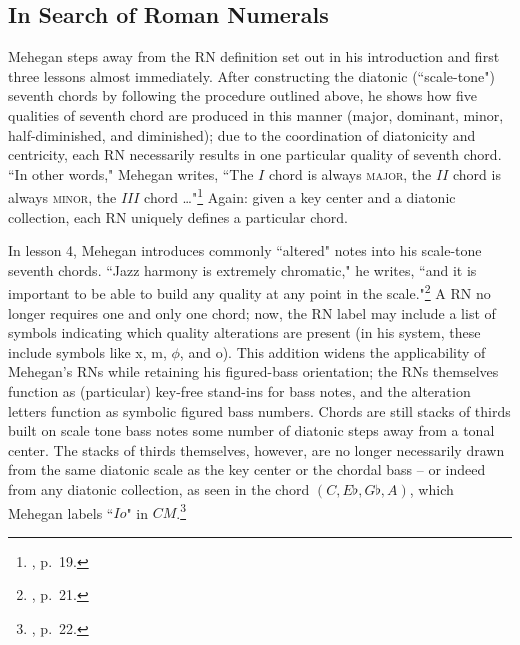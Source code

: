 \subsection{In Search of Roman Numerals}
Mehegan steps away from the RN definition set out in his introduction and first three lessons almost immediately.  After constructing the diatonic (``scale-tone") seventh chords by following the procedure outlined above, he shows how five qualities of seventh chord are produced in this manner (major, dominant, minor, half-diminished, and diminished); due to the coordination of diatonicity and centricity, each RN necessarily results in one particular quality of seventh chord.  ``In other words," Mehegan writes, ``The $I$ chord is always \textsc{major}, the $II$ chord is always \textsc{minor}, the $III$ chord \ldots "\footnote{\cite{mehegan1959}, p.\ 19.}  Again: given a key center and a diatonic collection, each RN uniquely defines a particular chord.

In lesson 4, Mehegan introduces commonly ``altered" notes into his scale-tone seventh chords.  ``Jazz harmony is extremely chromatic," he writes, ``and it is important to be able to build any quality at any point in the scale."\footnote{\cite{mehegan1959}, p.\ 21.}  A RN no longer requires one and only one chord; now, the RN label may include a list of symbols indicating which quality alterations are present (in his system, these include symbols like x, m, $\phi$, and o).  This addition widens the applicability of Mehegan's RNs while retaining his figured-bass orientation; the RNs themselves function as (particular) key-free stand-ins for bass notes, and the alteration letters function as symbolic figured bass numbers.  Chords are still stacks of thirds built on scale tone bass notes some number of diatonic steps away from a tonal center.  The stacks of thirds themselves, however, are no longer necessarily drawn from the same diatonic scale as the key center or the chordal bass -- or indeed from any diatonic collection, as seen in the chord $(C,E\flat,G\flat,A)$, which Mehegan labels ``$Io$" in $CM$.\footnote{\cite{mehegan1959}, p.\ 22.}

